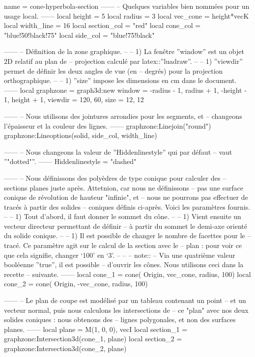 \documentclass[border = 3pt]{standalone}
\begin{document}
\begin{luadraw}{name = cone-hyperbola-section}
------
-- Quelques variables bien nommées pour un usage local.
------
    local height      =  5
    local radius      =  3
    local vec_cone    = height*vecK
    local width_line  =  16
    local section_col = "red"
    local cone_col    = "blue!50!black!75"
    local side_col    = "blue!75!black"

------
-- Définition de la zone graphique.
--
--     1) La fenêtre ''window'' est un objet 2D relatif au plan de
--     projection calculé par latex::''luadraw''.
--
--     1) ''viewdir'' permet de définir les deux angles de vue (en
--     degrés) pour la projection orthographique.
--
--     1) ''size'' impose les dimensions en cm dans le document.
------
    local graphzone = graph3d:new{
        window  = {-radius - 1, radius + 1, -height - 1, height + 1},
        viewdir = {120, 60},
        size    = {12, 12}
    }

------
-- Nous utilisons des jointures arrondies pour les segments, et
-- changeons l'épaisseur et la couleur des lignes.
------
    graphzone:Linejoin("round")
    graphzone:Lineoptions(solid, side_col, width_line)

------
-- Nous changeons la valeur de ''Hiddenlinestyle'' qui par défaut
-- vaut ''"dotted"''.
------
    Hiddenlinestyle = "dashed"

------
-- Nous définissons des polyèdres de type conique pour calculer des
-- sections planes juste après. Attetnion, car nous ne définissons
-- pas une surface conique de révolution de hauteur "infinie", et
-- nous ne pourrons pas effectuer de tracés à partir des solides
-- coniques définis ci-après. Voici les paramètres fournis.
--
--     1) Tout d'abord, il faut donner le sommet du cône.
--
--     1) Vient ensuite un vecteur directeur permettant de définir
--     à partir du sommet le demi-axe orienté du solide conique.
--
--     1) Il est possible de changer le nombre de facettes pour le
--     tracé. Ce paramètre agit sur le calcul de la section avec le
--     plan : pour voir ce que cela signifie, changer `100' en `3'.
--
--
-- note::
--     Via une quatrième valeur booléenne ''true'', il est possible
--     d'ouvrir les cônes. Nous utilisons ceci dans la recette
--     suivante.
------
    local cone_1 = cone(
        Origin, vec_cone, radius,
        100)
    local cone_2 = cone(
        Origin,  -vec_cone, radius,
        100)

------
-- Le plan de coupe est modélisé par un tableau contenant un point
-- et un vecteur normal, puis nous calculons les intersections de
-- ce "plan" avec nos deux solides coniques : nous obtenons des
-- lignes polygonales, et non des surfaces planes.
------
    local plane     = {M(1, 0, 0), vecI}
    local section_1 = graphzone:Intersection3d(cone_1, plane)
    local section_2 = graphzone:Intersection3d(cone_2, plane)


\end{luadraw}
\end{document}

